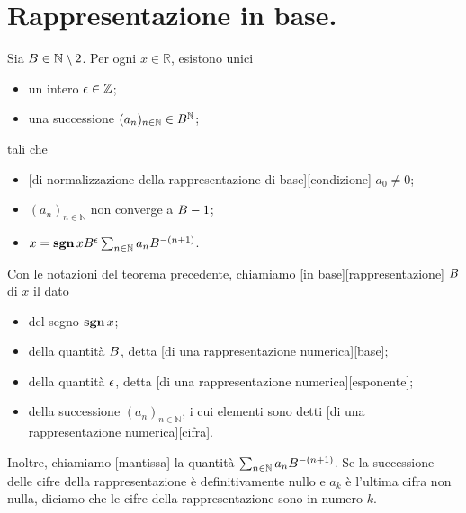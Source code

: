 \section{Rappresentazione in base.}
\label{CampoReale_RappesentazioneInBase}
\begin{Theorem}
	Sia $B \in \mathbb{N} \setminus 2$. Per ogni $x \in \mathbb{R}$, esistono unici
	\begin{itemize}
		\item un intero $\epsilon \in \mathbb{Z}$;
		\item una successione $(a_n)_{n \in \mathbb{N}} \in B^\mathbb{N}$;
	\end{itemize}
	tali che
	\begin{itemize}
		\item {}[di normalizzazione della rappresentazione di base][condizione] $a_0 \neq 0$;
		\item $(a_n)_{n \in \mathbb{N}}$ non converge a $B - 1$;
		\item $x = \operatorname{\textbf{sgn}}{x} B^\epsilon \sum_{n \in \mathbb{N}} a_n B^{- (n + 1)}$.
	\end{itemize}
\end{Theorem}
\begin{Definition}
	\label{CampoReale_RappresentazioneInBase}
	Con le notazioni del teorema precedente, chiamiamo [in base][rappresentazione] $B$ di $x$ il dato
	\begin{itemize}
		\item del segno $\operatorname{\textbf{sgn}}{x}$;
		\item della quantit\`a $B$, detta [di una rappresentazione numerica][base];
		\item della quantit\`a $\epsilon$, detta [di una rappresentazione numerica][esponente];
		\item della successione $(a_n)_{n \in \mathbb{N}}$, i cui elementi sono detti [di una rappresentazione numerica][cifra].
	\end{itemize}
	Inoltre, chiamiamo [mantissa] la quantit\`a $\sum_{n \in \mathbb{N}} a_n B^{- (n + 1)}$. Se la successione delle cifre della rappresentazione \`e definitivamente nullo e $a_k$ \`e l'ultima cifra non nulla, diciamo che le cifre della rappresentazione sono in numero $k$.
\end{Definition}
